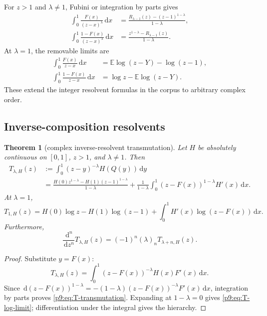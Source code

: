 \documentclass[11pt,oneside]{article}
\newtheorem{theorem}{Theorem}[section]
\theoremstyle{definition}
\theoremstyle{remark}
\newcommand{\E}{\mathbb E}
\newcommand{\dd}{\,\mathrm d}
\newcommand{\1}{\mathbf 1}
\begin{document}
For $z>1$ and $\lambda\ne1$, Fubini or integration by parts gives
\begin{align}
 \int_0^1\frac{F(x)}{(z-x)^\lambda}\dd x
 &=\frac{R_{\lambda-1}(z)-(z-1)^{1-\lambda}}{1-\lambda},
 \label{p9:eq:F-complex-resolvent}\\
 \int_0^1\frac{1-F(x)}{(z-x)^\lambda}\dd x
 &=\frac{z^{1-\lambda}-R_{\lambda-1}(z)}{1-\lambda}.
 \label{p9:eq:survival-complex-resolvent}
\end{align}
At $\lambda=1$, the removable limits are
\begin{align}
 \int_0^1\frac{F(x)}{z-x}\dd x
 &=\E\log(z-Y)-\log(z-1),
 \label{p9:eq:F-log-resolvent}\\
 \int_0^1\frac{1-F(x)}{z-x}\dd x
 &=\log z-\E\log(z-Y).
 \label{p9:eq:survival-log-resolvent}
\end{align}
These extend the integer resolvent formulas in the corpus to arbitrary complex
order.

\subsection{Inverse-composition resolvents}

\begin{theorem}[complex inverse-resolvent transmutation]
\label{p9:thm:inverse-resolvent}
Let $H$ be absolutely continuous on $[0,1]$, $z>1$, and $\lambda\ne1$.  Then
\begin{align}
 T_{\lambda,H}(z)
 &:=\int_0^1(z-y)^{-\lambda}H(Q(y))\dd y
 \label{p9:eq:T-def}\\
 &=\frac{H(0)z^{1-\lambda}-H(1)(z-1)^{1-\lambda}}
        {1-\lambda}
   +\frac1{1-\lambda}
    \int_0^1(z-F(x))^{1-\lambda}H'(x)\dd x.
 \label{p9:eq:T-transmutation}
\end{align}
At $\lambda=1$,
\begin{equation}
 T_{1,H}(z)
 =H(0)\log z-H(1)\log(z-1)
  +\int_0^1H'(x)\log(z-F(x))\dd x.
 \label{p9:eq:T-log-limit}
\end{equation}
Furthermore,
\begin{equation}
 \frac{\dd^n}{\dd z^n}T_{\lambda,H}(z)
 =(-1)^n(\lambda)_nT_{\lambda+n,H}(z).
 \label{p9:eq:T-derivative-hierarchy}
\end{equation}
\end{theorem}

\begin{proof}
Substitute $y=F(x)$:
\[
 T_{\lambda,H}(z)
 =\int_0^1(z-F(x))^{-\lambda}H(x)F'(x)\dd x.
\]
Since
$\dd(z-F(x))^{1-\lambda}=-(1-\lambda)
(z-F(x))^{-\lambda}F'(x)\dd x$, integration by parts proves
\cref{p9:eq:T-transmutation}.  Expanding at $1-\lambda=0$ gives
\cref{p9:eq:T-log-limit}; differentiation under the integral gives the hierarchy.
\end{proof}
\end{document}
